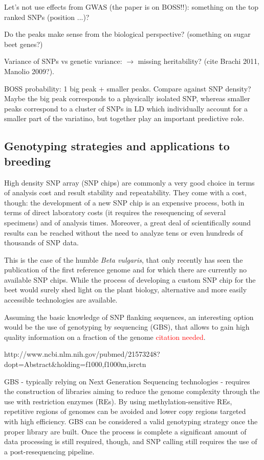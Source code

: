 Let's not use effects from GWAS (the paper is on BOSS!!): something on
the top ranked SNPs (position ...)?

Do the peaks make sense from the biological perspective? (something on
sugar beet genes?)

Variance of SNPs vs genetic variance: $\rightarrow$ missing
heritability? (cite Brachi 2011, Manolio 2009?).

BOSS probability: 1 big peak + smaller peaks. Compare against SNP
density? Maybe the big peak corresponds to a physically isolated SNP,
whereas smaller peaks correspond to a cluster of SNPs in LD which
individually account for a smaller part of the variatino, but together
play an important predictive role. 


\subsection{Genotyping strategies and applications to breeding}
High density SNP array (SNP chips) are commonly a very good choice in
terms of analysis cost and result stability and repeatability. They come
with a cost, though: the development of a new SNP chip is an expensive
process, both in terms of direct laboratory costs (it requires the
resequencing of several specimens) and of analysis times. Moreover, a great deal
of scientifically sound results can be reached without the need to analyze
tens or even hundreds of thousands of SNP data.

This is the case of the humble \emph{Beta vulgaris}, that only recently
has seen the publication of the first reference genome \cite{dohm2013genome}
and for which there are currently no available SNP chips. While the process
of developing a custom SNP chip for the beet would surely shed light
on the plant biology, alternative and more easily accessible technologies 
are available.

Assuming the basic knowledge of SNP flanking sequences, an interesting
option would be the use of genotyping by sequencing (GBS), that allows
to gain high quality information on a fraction of the genome
\textcolor{red}{citation needed}. 

http://www.ncbi.nlm.nih.gov/pubmed/21573248?dopt=Abstract&holding=f1000,f1000m,isrctn

GBS - typically relying on Next Generation Sequencing technologies - 
requires the construction of libraries aiming to reduce the genome 
complexity through the use with restriction enzymes (REs). By using 
methylation-sensitive REs, repetitive regions of genomes can be avoided 
and lower copy regions targeted with high efficiency.
GBS can be considered a valid genotyping strategy once the proper library
are built. Once the process is complete a significant amount of data 
processing is still required, though, and SNP calling still requires the use
of a post-resequencing pipeline.

